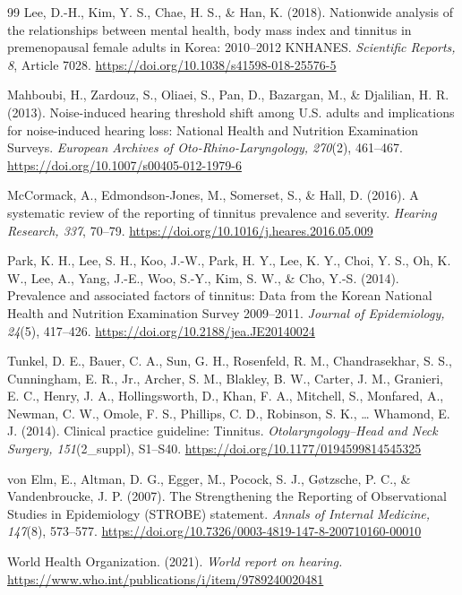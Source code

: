 \begin{thebibliography}{99}
 Lee, D.-H., Kim, Y. S., Chae, H. S., \& Han, K. (2018). Nationwide analysis of the relationships between mental health, body mass index and tinnitus in premenopausal female adults in Korea: 2010--2012 KNHANES. \textit{Scientific Reports, 8}, Article 7028. \url{https://doi.org/10.1038/s41598-018-25576-5}

 Mahboubi, H., Zardouz, S., Oliaei, S., Pan, D., Bazargan, M., \& Djalilian, H. R. (2013). Noise-induced hearing threshold shift among U.S. adults and implications for noise-induced hearing loss: National Health and Nutrition Examination Surveys. \textit{European Archives of Oto-Rhino-Laryngology, 270}(2), 461--467. \url{https://doi.org/10.1007/s00405-012-1979-6}

 McCormack, A., Edmondson-Jones, M., Somerset, S., \& Hall, D. (2016). A systematic review of the reporting of tinnitus prevalence and severity. \textit{Hearing Research, 337}, 70--79. \url{https://doi.org/10.1016/j.heares.2016.05.009}

 Park, K. H., Lee, S. H., Koo, J.-W., Park, H. Y., Lee, K. Y., Choi, Y. S., Oh, K. W., Lee, A., Yang, J.-E., Woo, S.-Y., Kim, S. W., \& Cho, Y.-S. (2014). Prevalence and associated factors of tinnitus: Data from the Korean National Health and Nutrition Examination Survey 2009--2011. \textit{Journal of Epidemiology, 24}(5), 417--426. \url{https://doi.org/10.2188/jea.JE20140024}

 Tunkel, D. E., Bauer, C. A., Sun, G. H., Rosenfeld, R. M., Chandrasekhar, S. S., Cunningham, E. R., Jr., Archer, S. M., Blakley, B. W., Carter, J. M., Granieri, E. C., Henry, J. A., Hollingsworth, D., Khan, F. A., Mitchell, S., Monfared, A., Newman, C. W., Omole, F. S., Phillips, C. D., Robinson, S. K., \ldots{} Whamond, E. J. (2014). Clinical practice guideline: Tinnitus. \textit{Otolaryngology--Head and Neck Surgery, 151}(2\_suppl), S1--S40. \url{https://doi.org/10.1177/0194599814545325}

 von Elm, E., Altman, D. G., Egger, M., Pocock, S. J., G\o{}tzsche, P. C., \& Vandenbroucke, J. P. (2007). The Strengthening the Reporting of Observational Studies in Epidemiology (STROBE) statement. \textit{Annals of Internal Medicine, 147}(8), 573--577. \url{https://doi.org/10.7326/0003-4819-147-8-200710160-00010}

 World Health Organization. (2021). \textit{World report on hearing.} \url{https://www.who.int/publications/i/item/9789240020481}
\end{thebibliography}
